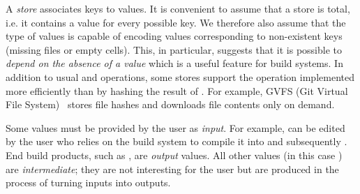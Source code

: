 A \emph{store} associates keys to values. It is convenient to assume that a store
is total, i.e. it contains a value for every possible key. We therefore also
assume that the type of values is capable of encoding values corresponding to
non-existent keys (missing files or empty cells). This, in particular, suggests
that it is possible to \emph{depend on the absence of a value} which is a useful
feature for build systems. In addition to usual  and  operations,
some stores support the  operation implemented more efficiently than
by hashing the result of . For example, GVFS (Git Virtual File
System)~\cite{gvfs} stores file hashes and downloads file contents only on demand.

Some values must be provided by the user as \emph{input}. For example,
 can be edited by the user who relies on the build system to
compile it into  and subsequently . End build products,
such as , are \emph{output} values. All other values (in this case
) are \emph{intermediate}; they are not interesting for the user
but are produced in the process of turning inputs into outputs.
